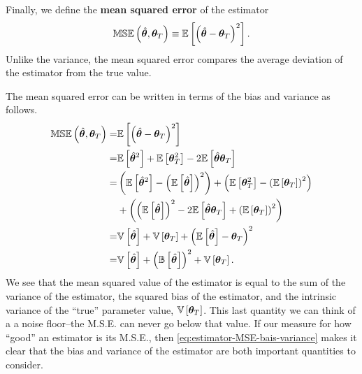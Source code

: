 Finally, we define the \textbf{mean squared error} of the estimator
\begin{align}
    \label{eq:estimator-mse-definition}
    \mathbb{MSE}\left(\hat{{\bm \theta}},{\bm \theta}_T\right)
    \equiv
    \mathbb{E}\left[\left(\hat{{\bm \theta}} - {\bm \theta}_T\right)^2\right]
    .
\end{align}
Unlike the variance, the mean squared error compares the average deviation of the estimator from the true value.

The mean squared error can be written in terms of the bias and variance as follows.
\begin{align}
    \label{eq:estimator-MSE-bais-variance}
    \mathbb{MSE}\left(\hat{{\bm \theta}},{\bm \theta}_T\right)
    =&
    \mathbb{E}\left[\left(\hat{{\bm \theta}} - {\bm \theta}_T\right)^2\right]
    \nonumber\\
    =&
    \mathbb{E}\left[\hat{{\bm \theta}}^2\right]
    +
    \mathbb{E}\left[{\bm \theta}_T^2\right]
    - 
    2\mathbb{E}\left[\hat{{\bm \theta}}{\bm \theta}_T\right]
    \nonumber\\
    =&
    \left(\mathbb{E}\left[
        \hat{{\bm \theta}}^2\right] 
        - 
        \left(\mathbb{E}\left[\hat{{\bm \theta}}\right]\right)^2
    \right)
    +
    \left(
        \mathbb{E}\left[{\bm \theta}_T^2\right] 
        - 
        \left(\mathbb{E}\left[{\bm \theta}_T\right]\right)^2
    \right)
    \nonumber\\
    &
    +
    \left(
        \left(\mathbb{E}\left[\hat{{\bm \theta}}\right]\right)^2
        - 
        2\mathbb{E}\left[\hat{{\bm \theta}}{\bm \theta}_T\right]
        +
        \left(\mathbb{E}\left[{\bm \theta}_T\right]\right)^2
    \right)
    \nonumber\\
    =&
    \mathbb{V}\left[\hat{{\bm \theta}}\right]
    +
    \mathbb{V}\left[{\bm \theta}_T\right]
    +
    \left(\mathbb{E}\left[\hat{{\bm \theta}}\right] - {\bm \theta}_T\right)^2
    \nonumber\\
    =&
    \mathbb{V}\left[\hat{{\bm \theta}}\right]
    +
    \left(\mathbb{B}\left[\hat{{\bm \theta}}\right]\right)^2
    +
    \mathbb{V}\left[{\bm \theta}_T\right]
    .
\end{align}
We see that the mean squared value of the estimator is equal to the sum of the variance of the estimator, the squared bias of the estimator, and the intrinsic variance of the ``true'' parameter value, $\mathbb{V}\left[{\bm \theta}_T\right]$.
This last quantity we can think of a a noise floor--the M.S.E. can never go below that value.
If our measure for how ``good'' an estimator is its M.S.E., then \eqref{eq:estimator-MSE-bais-variance} makes it clear that the bias and variance of the estimator are both important quantities to consider.

